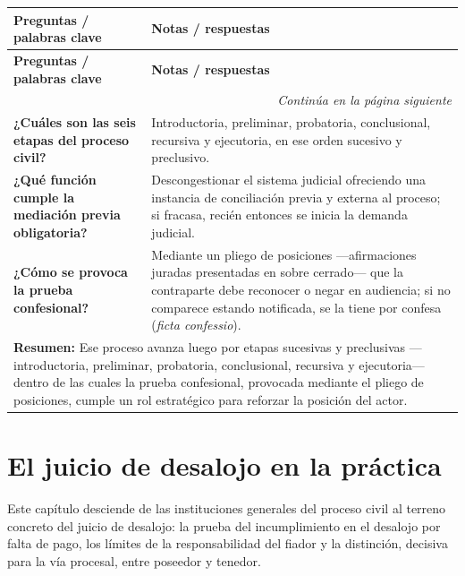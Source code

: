 \documentclass[12pt,oneside]{book}
\begin{document}
\begin{longtable}{
    p{}
    p{}
}
\toprule
\textbf{Preguntas / palabras clave} & \textbf{Notas / respuestas} \\
\midrule
\endfirsthead
\toprule
\textbf{Preguntas / palabras clave} & \textbf{Notas / respuestas} \\
\midrule
\endhead
\midrule
\multicolumn{2}{r}{\textit{Continúa en la página siguiente}} \\
\endfoot
\bottomrule
\endlastfoot

\textbf{¿Cuáles son las seis etapas del proceso civil?} &
Introductoria, preliminar, probatoria, conclusional, recursiva y ejecutoria, en ese orden sucesivo y preclusivo. \\

\textbf{¿Qué función cumple la mediación previa obligatoria?} &
Descongestionar el sistema judicial ofreciendo una instancia de conciliación previa y externa al proceso; si fracasa, recién entonces se inicia la demanda judicial. \\

\textbf{¿Cómo se provoca la prueba confesional?} &
Mediante un pliego de posiciones —afirmaciones juradas presentadas en sobre cerrado— que la contraparte debe reconocer o negar en audiencia; si no comparece estando notificada, se la tiene por confesa (\textit{ficta confessio}). \\

\midrule
\multicolumn{2}{p{\dimexpr\textwidth-2\tabcolsep\relax}}{
\textbf{Resumen:} Ese proceso avanza luego por etapas sucesivas y preclusivas —introductoria, preliminar, probatoria, conclusional, recursiva y ejecutoria— dentro de las cuales la prueba confesional, provocada mediante el pliego de posiciones, cumple un rol estratégico para reforzar la posición del actor.
} \\

\end{longtable}

\chapter[El juicio de desalojo en la práctica]{El juicio de desalojo en la práctica}
\label{ch:practica}

Este capítulo desciende de las instituciones generales del proceso civil al terreno concreto del juicio de desalojo: la prueba del incumplimiento en el desalojo por falta de pago, los límites de la responsabilidad del fiador y la distinción, decisiva para la vía procesal, entre poseedor y tenedor.
\end{document}
